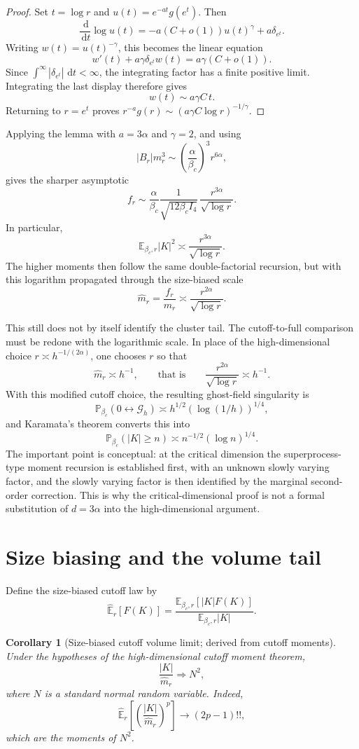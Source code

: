 \documentclass[11pt,reqno]{book}
\numberwithin{equation}{chapter}
\theoremstyle{plain}
\newtheorem{corollary}[theorem]{Corollary}
\theoremstyle{definition}
\theoremstyle{remark}
\newcommand{\1}{\mathbf 1}
\newcommand{\dd}{\,\mathrm d}
\begin{document}
\begin{proof}
Set \(t=\log r\) and \(u(t)=e^{-at}g(e^t)\). Then
\[
  \frac{\dd}{\dd t}\log u(t)
  =
  -a(C+o(1))u(t)^\gamma+a\delta_{e^t}.
\]
Writing \(w(t)=u(t)^{-\gamma}\), this becomes the linear equation
\[
  w'(t)+a\gamma\delta_{e^t}w(t)=a\gamma(C+o(1)).
\]
Since \(\int^\infty|\delta_{e^t}|\,\dd t<\infty\), the integrating factor has
a finite positive limit. Integrating the last display therefore gives
\[
  w(t)\sim a\gamma C\,t.
\]
Returning to \(r=e^t\) proves \(r^{-a}g(r)\sim(a\gamma C\log r)^{-1/\gamma}\).
\end{proof}

Applying the lemma with \(a=3\alpha\) and \(\gamma=2\), and using
\[
  |B_r|m_r^3
  \sim
  \left(\frac{\alpha}{\beta_c}\right)^3 r^{6\alpha},
\]
gives the sharper asymptotic
\[
  f_r
  \sim
  \frac{\alpha}{\beta_c}
  \frac{1}{\sqrt{12\beta_c I_4}}\,
  \frac{r^{3\alpha}}{\sqrt{\log r}}.
\]
In particular,
\[
  \mathbb E_{\beta_c,r}|K|^2
  \asymp
  \frac{r^{3\alpha}}{\sqrt{\log r}}.
\]
The higher moments then follow the same double-factorial recursion, but with
this logarithm propagated through the size-biased scale
\[
  \widehat m_r
  =
  \frac{f_r}{m_r}
  \asymp
  \frac{r^{2\alpha}}{\sqrt{\log r}}.
\]

This still does not by itself identify the cluster tail. The cutoff-to-full comparison must be redone with the logarithmic scale. In place of the high-dimensional choice $r\asymp h^{-1/(2\alpha)}$, one chooses $r$ so that
\[
  \widehat m_r\asymp h^{-1},
  \qquad\text{that is}\qquad
  \frac{r^{2\alpha}}{\sqrt{\log r}}\asymp h^{-1}.
\]
With this modified cutoff choice, the resulting ghost-field singularity is
\[
  \mathbb P_{\beta_c}(0\leftrightarrow\mathcal G_h)
  \asymp
  h^{1/2}(\log(1/h))^{1/4},
\]
and Karamata's theorem converts this into
\[
  \mathbb P_{\beta_c}(|K|\geq n)
  \asymp
  n^{-1/2}(\log n)^{1/4}.
\]
The important point is conceptual: at the critical dimension the superprocess-type moment recursion is established first, with an unknown slowly varying factor, and the slowly varying factor is then identified by the marginal second-order correction. This is why the critical-dimensional proof is not a formal substitution of $d=3\alpha$ into the high-dimensional argument.

\section{Size biasing and the volume tail}

Define the size-biased cutoff law by
\[
  \widehat{\mathbb E}_r[F(K)]
  =
  \frac{\mathbb E_{\beta_c,r}[|K|F(K)]}
       {\mathbb E_{\beta_c,r}|K|}.
\]
\begin{corollary}[Size-biased cutoff volume limit; derived from cutoff moments]
Under the hypotheses of the high-dimensional cutoff moment theorem,
\[
  \frac{|K|}{\widehat m_r}\Longrightarrow N^2,
\]
where $N$ is a standard normal random variable. Indeed,
\[
  \widehat{\mathbb E}_r
  \left[
    \left(\frac{|K|}{\widehat m_r}\right)^p
  \right]
  \longrightarrow
  (2p-1)!!,
\]
which are the moments of $N^2$.
\end{corollary}
\end{document}

